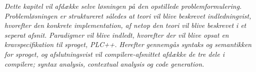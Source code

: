 \textit{Dette kapitel vil afdække selve løsningen på den opstillede problemformulering. Problemløsningen er struktureret således at teori vil blive beskrevet indledningvist, hvorefter den konkrete implementation, af netop den teori vil blive beskrevet i et seperat afsnit. Paradigmer vil blive indledt, hvorefter der vil blive opsat en kravspecifikation til sproget, PLC++. Herefter gennemgås syntaks og semantikken for sproget, og afslutningsvist vil compilere-afsnittet afdække de tre dele i compilere; syntax analysis, contextual analysis og code generation.}